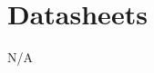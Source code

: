 \documentclass[bibtotocnumbered,abstract=on,paper=a4,fontsize=12pt,parskip=on,halfparskip=on]{scrartcl}		%
\begin{document}
\section{Datasheets}
N/A
\clearpage
\end{document}
